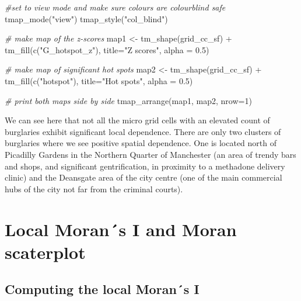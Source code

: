 \documentclass[
  krantz2]{krantz}
\makeatletter
\newenvironment{Shaded}{\begin{snugshade}}{\end{snugshade}}
\newcommand{\AttributeTok}[1]{\textcolor[rgb]{0.61,0.61,0.61}{#1}}
\newcommand{\CommentTok}[1]{\textcolor[rgb]{0.37,0.37,0.37}{\textit{#1}}}
\newcommand{\DecValTok}[1]{\textcolor[rgb]{0.06,0.06,0.06}{#1}}
\newcommand{\FloatTok}[1]{\textcolor[rgb]{0.06,0.06,0.06}{#1}}
\newcommand{\FunctionTok}[1]{\textcolor[rgb]{0,0,0}{#1}}
\newcommand{\NormalTok}[1]{#1}
\newcommand{\OtherTok}[1]{\textcolor[rgb]{0.37,0.37,0.37}{#1}}
\newcommand{\SpecialCharTok}[1]{\textcolor[rgb]{0,0,0}{#1}}
\newcommand{\StringTok}[1]{\textcolor[rgb]{0.5,0.5,0.5}{#1}}
\newenvironment{kframe}{%
\medskip{}
\setlength{\fboxsep}{.8em}
 \def\at@end@of@kframe{}%
 \ifinner\ifhmode%
  \def\at@end@of@kframe{\end{minipage}}%
  \begin{minipage}{\columnwidth}%
 \fi\fi%
 \def\FrameCommand##1{\hskip\@totalleftmargin \hskip-\fboxsep
 \colorbox{shadecolor}{##1}\hskip-\fboxsep
     \hskip-\linewidth \hskip-\@totalleftmargin \hskip\columnwidth}%
 \MakeFramed {\advance\hsize-\width
   \@totalleftmargin\z@ \linewidth\hsize
   \@setminipage}}%
 {\par\unskip\endMakeFramed%
 \at@end@of@kframe}
\renewenvironment{Shaded}{\begin{kframe}}{\end{kframe}}
\makeatother
\begin{document}
\begin{Shaded}
\begin{Highlighting}[]
\CommentTok{\#set to view mode and make sure colours are colourblind safe}
\FunctionTok{tmap\_mode}\NormalTok{(}\StringTok{"view"}\NormalTok{)}
\FunctionTok{tmap\_style}\NormalTok{(}\StringTok{"col\_blind"}\NormalTok{)}

\CommentTok{\# make map of the z{-}scores}
\NormalTok{map1 }\OtherTok{\textless{}{-}} \FunctionTok{tm\_shape}\NormalTok{(grid\_cc\_sf) }\SpecialCharTok{+} 
  \FunctionTok{tm\_fill}\NormalTok{(}\FunctionTok{c}\NormalTok{(}\StringTok{"G\_hotspot\_z"}\NormalTok{), }\AttributeTok{title=}\StringTok{"Z scores"}\NormalTok{, }\AttributeTok{alpha =} \FloatTok{0.5}\NormalTok{)}

\CommentTok{\# make map of significant hot spots}
\NormalTok{map2 }\OtherTok{\textless{}{-}} \FunctionTok{tm\_shape}\NormalTok{(grid\_cc\_sf) }\SpecialCharTok{+}
  \FunctionTok{tm\_fill}\NormalTok{(}\FunctionTok{c}\NormalTok{(}\StringTok{"hotspot"}\NormalTok{), }\AttributeTok{title=}\StringTok{"Hot spots"}\NormalTok{, }\AttributeTok{alpha =} \FloatTok{0.5}\NormalTok{)}

\CommentTok{\# print both maps side by side}
\FunctionTok{tmap\_arrange}\NormalTok{(map1, map2, }\AttributeTok{nrow=}\DecValTok{1}\NormalTok{)}
\end{Highlighting}
\end{Shaded}

We can see here that not all the micro grid cells with an elevated count of burglaries exhibit significant local dependence. There are only two clusters of burglaries where we see positive spatial dependence. One is located north of Picadilly Gardens in the Northern Quarter of Manchester (an area of trendy bars and shops, and significant gentrification, in proximity to a methadone delivery clinic) and the Deansgate area of the city centre (one of the main commercial hubs of the city not far from the criminal courts).

\hypertarget{local-morans-i-and-moran-scaterplot}{%
\section{Local Moran´s I and Moran scaterplot}\label{local-morans-i-and-moran-scaterplot}}

\hypertarget{computing-the-local-morans-i}{%
\subsection{Computing the local Moran´s I}\label{computing-the-local-morans-i}}
\end{document}
